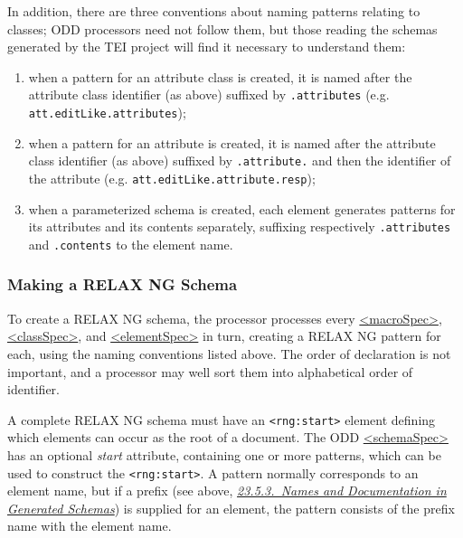 In addition, there are three conventions about naming patterns relating to classes; ODD processors need not follow them, but those reading the schemas generated by the TEI project will find it necessary to understand them: \begin{enumerate}
\item when a pattern for an attribute class is created, it is named after the attribute class identifier (as above) suffixed by \texttt{.attributes} (e.g. \texttt{att.editLike.attributes});
\item when a pattern for an attribute is created, it is named after the attribute class identifier (as above) suffixed by \texttt{.attribute.} and then the identifier of the attribute (e.g. \texttt{att.editLike.attribute.resp});
\item when a parameterized schema is created, each element generates patterns for its attributes and its contents separately, suffixing respectively \texttt{.attributes} and \texttt{.contents} to the element name.
\end{enumerate}
\subsubsection[{Making a RELAX NG Schema}]{Making a RELAX NG Schema}\label{IMRN}\par
To create a RELAX NG schema, the processor processes every \hyperref[TEI.macroSpec]{<macroSpec>}, \hyperref[TEI.classSpec]{<classSpec>}, and \hyperref[TEI.elementSpec]{<elementSpec>} in turn, creating a RELAX NG pattern for each, using the naming conventions listed above. The order of declaration is not important, and a processor may well sort them into alphabetical order of identifier.\par
A complete RELAX NG schema must have an \texttt{<rng:start>} element defining which elements can occur as the root of a document. The ODD \hyperref[TEI.schemaSpec]{<schemaSpec>} has an optional {\itshape start} attribute, containing one or more patterns, which can be used to construct the \texttt{<rng:start>}. A pattern normally corresponds to an element name, but if a prefix (see above, \textit{\hyperref[IM-naming]{23.5.3.\ Names and Documentation in Generated Schemas}}) is supplied for an element, the pattern consists of the prefix name with the element name.

